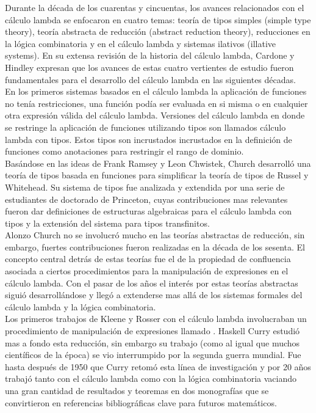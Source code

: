 Durante la década de los cuarentas y cincuentas, los avances
relacionados con el cálculo lambda se enfocaron en cuatro temas: teoría de
tipos simples (simple type theory), teoría abstracta de reducción
(abstract reduction theory), reducciones en la lógica
combinatoria y en el cálculo lambda y sistemas ilativos (illative systems). En
su extensa revisión de la historia del cálculo lambda, Cardone y Hindley
expresan que  los avances de estas cuatro vertientes de estudio fueron
fundamentales para el desarrollo del cálculo lambda en las siguientes
décadas.\\

En los primeros sistemas basados en el cálculo lambda la aplicación de
funciones no tenía restricciones, una función podía ser evaluada en si
misma o en cualquier otra expresión válida del cálculo lambda. Versiones del
cálculo lambda en donde se restringe la aplicación de funciones utilizando
tipos son llamados cálculo lambda con tipos. Estos tipos son incrustados
incrustados en la definición de funciones como anotaciones para
restringir el rango de dominio.\\

Basándose en las ideas de Frank Ramsey y Leon Chwistek, Church
desarrolló una teoría de tipos basada en funciones para simplificar la
teoría de tipos de Russel y Whitehead. Su sistema de tipos fue
analizada y extendida por una serie de estudiantes de doctorado de
Princeton, cuyas contribuciones mas relevantes fueron dar definiciones
de estructuras algebraicas para el cálculo lambda con tipos y la extensión del
sistema para tipos transfinitos.\\

Alonzo Church no se involucró mucho en las teorías abstractas de
reducción, sin embargo, fuertes contribuciones fueron realizadas en la
década de los sesenta. El concepto central detrás de estas teorías fue
el de la propiedad de confluencia asociada a ciertos procedimientos
para la manipulación de expresiones en el cálculo lambda. Con el pasar de los
años el interés por estas teorías abstractas siguió desarrollándose y
llegó a extenderse mas allá de los sistemas formales del cálculo lambda y la
lógica combinatoria.\\

Los primeros trabajos de Kleene y Rosser con el cálculo lambda involucraban un
procedimiento de manipulación de expresiones llamado \betaredu. Haskell
Curry estudió mas a fondo esta reducción, sin embargo su trabajo (como
al igual que muchos científicos de la época) se vio interrumpido por
la segunda guerra mundial. Fue hasta después de 1950 que Curry retomó
esta línea de investigación y por 20 años trabajó tanto con el cálculo lambda
como con la lógica combinatoria vaciando una gran cantidad de
resultados y teoremas en dos monografías que se convirtieron en
referencias bibliográficas clave para futuros matemáticos.\\

